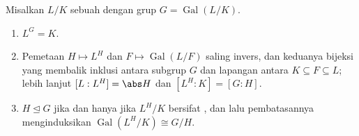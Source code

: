 \begin{theorem}
\label{thm:b3:galois:fundamental}
Misalkan $L/K$ sebuah  dengan grup $G =
\operatorname{Gal}(L/K)$.
\begin{enumerate}
  \item $L^G = K$.
  \item Pemetaan $H \mapsto L^H$ dan $F \mapsto
        \operatorname{Gal}(L/F)$ saling invers, dan keduanya
        bijeksi yang membalik inklusi antara subgrup $G$
        dan lapangan antara $K \subseteq F \subseteq L$;
        lebih lanjut $[L : L^H] = \abs H$ dan $[L^H : K] = [G : H]$.
  \item $H \trianglelefteq G$ jika dan hanya jika $L^H/K$ bersifat , dan lalu
        pembatasannya menginduksikan $\operatorname{Gal}(L^H/K) \cong
        G/H$.
\end{enumerate}
\end{theorem}


